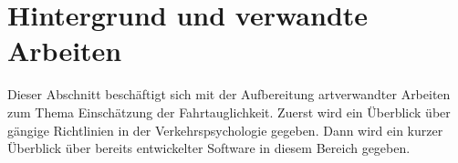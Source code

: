 \section{Hintergrund und verwandte Arbeiten}
\label{relatedWork}
Dieser Abschnitt beschäftigt sich mit der Aufbereitung artverwandter Arbeiten zum Thema Einschätzung der Fahrtauglichkeit. Zuerst wird ein Überblick über gängige Richtlinien in der Verkehrspsychologie gegeben. Dann wird ein kurzer Überblick über bereits entwickelter Software in diesem Bereich gegeben. 